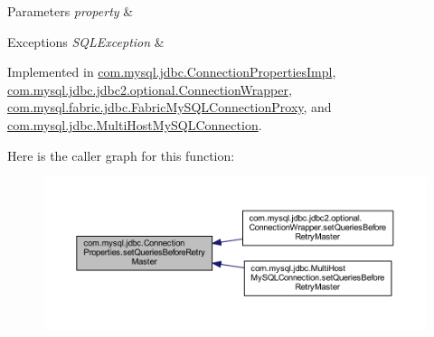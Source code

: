 \begin{DoxyParams}{Parameters}
{\em property} & \\
\hline
\end{DoxyParams}

\begin{DoxyExceptions}{Exceptions}
{\em S\+Q\+L\+Exception} & \\
\hline
\end{DoxyExceptions}


Implemented in \mbox{\hyperlink{classcom_1_1mysql_1_1jdbc_1_1_connection_properties_impl_a489f6cf07764fc854520a6287e19aadf}{com.\+mysql.\+jdbc.\+Connection\+Properties\+Impl}}, \mbox{\hyperlink{classcom_1_1mysql_1_1jdbc_1_1jdbc2_1_1optional_1_1_connection_wrapper_a3a5da08b543633c1643a07d41696b7c7}{com.\+mysql.\+jdbc.\+jdbc2.\+optional.\+Connection\+Wrapper}}, \mbox{\hyperlink{classcom_1_1mysql_1_1fabric_1_1jdbc_1_1_fabric_my_s_q_l_connection_proxy_a3bb927836cc5129a38451d8ad64830db}{com.\+mysql.\+fabric.\+jdbc.\+Fabric\+My\+S\+Q\+L\+Connection\+Proxy}}, and \mbox{\hyperlink{classcom_1_1mysql_1_1jdbc_1_1_multi_host_my_s_q_l_connection_abb525c1cf46936e3754abab5a8a83997}{com.\+mysql.\+jdbc.\+Multi\+Host\+My\+S\+Q\+L\+Connection}}.

Here is the caller graph for this function\+:\nopagebreak
\begin{figure}[H]
\begin{center}
\leavevmode
\includegraphics[width=350pt]{interfacecom_1_1mysql_1_1jdbc_1_1_connection_properties_a957986bd12af4715d9b9bb097109a61b_icgraph}
\end{center}
\end{figure}
\mbox{\label{interfacecom_1_1mysql_1_1jdbc_1_1_connection_properties_a60491800609ee12f89f5545a9e26db4c}} 
